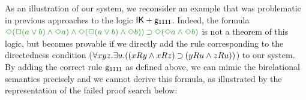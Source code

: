 
\begin{remark}
	As an illustration of our system, we reconsider an example that was problematic in previous approaches to the logic $\mathsf{IK} + \mathsf{g_{1111}}$.
	Indeed, the formula $\fm{\DIA(\BOX(a \OR b) \AND \DIA a) \AND \DIA(\BOX(a \OR b) \AND \DIA b)) \IMP \DIA(\DIA a \AND \DIA b)}$ is not a theorem of this logic, but becomes provable if we directly add the rule corresponding to the directedness condition ($\forall xyz. \exists u. ((xRy \mathbin{\wedge} xRz) \mathbin{\supset} (yRu \mathbin{\wedge} zRu))$) to our system.
	By adding the correct rule $\mathsf{g_{1111}}$ as defined above, we can mimic the birelational semantics precisely and we cannot derive this formula, as illustrated by the representation of the failed proof search below:
	

\end{remark}
